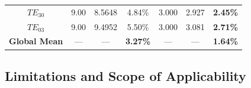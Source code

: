 \documentclass[preprint,12pt]{elsarticle}
\begin{document}
\begin{table}[!htbp]
{\begin{tabular}{@{} c c c c c c c @{}}
            $TE_{30}$                 & 9.00                            & 8.5648                    & 4.84\%                        & 3.000                        & 2.927                  & \textbf{2.45\%}           \\
            $TE_{03}$                 & 9.00                            & 9.4952                    & 5.50\%                        & 3.000                        & 3.081                  & \textbf{2.71\%}           \\
            \midrule
            \textbf{Global Mean}      & ---                             & ---                       & \textbf{3.27\%}               & ---                          & ---                    & \textbf{1.64\%}           \\
            \bottomrule
        \end{tabular}%
    }
\end{table}

\subsection{Limitations and Scope of Applicability}
\label{subsec:limitations_scope}
\end{document}
